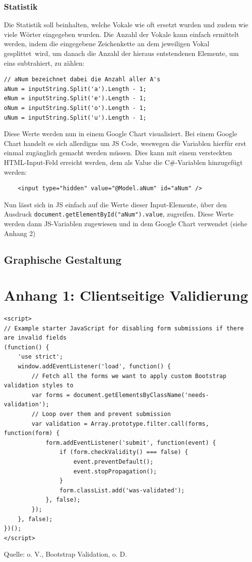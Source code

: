 \documentclass[a4paper,
12pt,
oneside]
{article}
\begin{document}
	 \subsubsection{Statistik}
	 Die Statistik soll beinhalten, welche Vokale wie oft ersetzt wurden und zudem wie viele Wörter eingegeben wurden. Die Anzahl der Vokale kann einfach ermittelt werden, indem die eingegebene Zeichenkette an dem jeweiligen Vokal \glqq gesplittet\grqq~wird, um danach die Anzahl der hieraus entstendenen Elemente, um eins subtrahiert, zu zählen:
	 \lstset{style=csharp}
	 \begin{lstlisting}
// aNum bezeichnet dabei die Anzahl aller A's
aNum = inputString.Split('a').Length - 1;
eNum = inputString.Split('e').Length - 1;
oNum = inputString.Split('o').Length - 1;
uNum = inputString.Split('u').Length - 1;
	 \end{lstlisting}
	 Diese Werte werden nun in einem Google Chart visualisiert. Bei einem Google Chart handelt es sich allerdigns um JS Code, weswegen die Variablen hierfür erst einmal zugänglich gemacht werden müssen. Dies kann mit einem versteckten HTML-Input-Feld erreicht werden, dem als Value die C\#-Variablen hinzugefügt werden:
	\lstset{style=cshtml}
	\begin{lstlisting}
	<input type="hidden" value="@Model.aNum" id="aNum" />
	\end{lstlisting}
	Nun lässt sich in JS einfach auf die Werte dieser Input-Elemente, über den Ausdruck \texttt{document.getElementById("aNum").value}, zugreifen. Diese Werte werden dann JS-Variablen zugewiesen und in dem Google Chart verwendet (siehe Anhang 2)
	 
	 
	 
	 
	\subsection{Graphische Gestaltung}
	\clearpage
	
	
	
	
	
	\section*{Anhang 1: Clientseitige Validierung}
	\begin{lstlisting}
<script>
// Example starter JavaScript for disabling form submissions if there are invalid fields
(function() {
	'use strict';
	window.addEventListener('load', function() {
		// Fetch all the forms we want to apply custom Bootstrap validation styles to
		var forms = document.getElementsByClassName('needs-validation');
		// Loop over them and prevent submission
		var validation = Array.prototype.filter.call(forms, function(form) {
			form.addEventListener('submit', function(event) {
				if (form.checkValidity() === false) {
					event.preventDefault();
					event.stopPropagation();
				}
				form.classList.add('was-validated');
			}, false);
		});
	}, false);
})();
</script>
	\end{lstlisting}
	{\centering\footnotesize Quelle: o. V., Bootstrap Validation, o. D.\par}
	\clearpage
	
\end{document}
